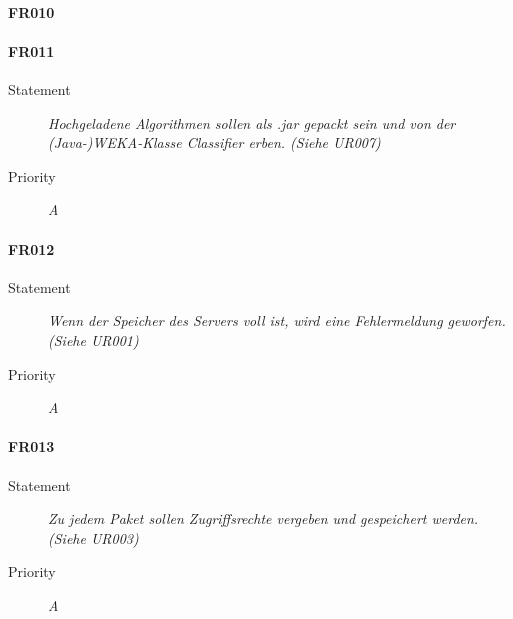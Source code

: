 \paragraph{FR010}

\paragraph{FR011}
\begin{description}
  \item [Statement] 
    \textit{Hochgeladene Algorithmen sollen als .jar gepackt sein und von der (\gls{Java}-)\gls{WEKA}-Klasse Classifier erben.
	(Siehe UR007)}
  \item [Priority] \textit{A}
\end{description}

\paragraph{FR012}
\begin{description}
  \item [Statement] 
    \textit{Wenn der Speicher des Servers voll ist, wird eine Fehlermeldung geworfen.
	(Siehe UR001)}
  \item [Priority] \textit{A}
\end{description}

\paragraph{FR013}
\begin{description}
  \item [Statement] 
    \textit{Zu jedem \gls{Paket} sollen Zugriffsrechte vergeben und gespeichert werden.
	(Siehe UR003)}
  \item [Priority] \textit{A}
\end{description}

